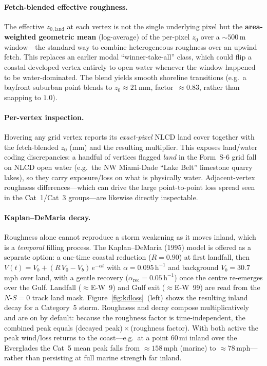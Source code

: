 \documentclass[11pt]{article}
\begin{document}
\paragraph{Fetch-blended effective roughness.}
The effective $z_{0,\text{land}}$ at each vertex is not the single underlying
pixel but the \textbf{area-weighted geometric mean} (log-average) of the
per-pixel $z_0$ over a $\sim500$\,m window---the standard way to combine
heterogeneous roughness over an upwind fetch. This replaces an earlier
modal ``winner-take-all'' class, which could flip a coastal developed vertex
entirely to open water whenever the window happened to be water-dominated. The
blend yields smooth shoreline transitions (e.g.\ a bayfront suburban point
blends to $z_0\!\approx\!21$\,mm, factor~$\approx\!0.83$, rather than snapping to
$1.0$).

\paragraph{Per-vertex inspection.}
Hovering any grid vertex reports its \emph{exact-pixel} NLCD land cover together
with the fetch-blended $z_0$ (mm) and the resulting multiplier. This exposes
land/water coding discrepancies: a handful of vertices flagged \emph{land} in the
Form~S-6 grid fall on NLCD open water (e.g.\ the NW Miami-Dade ``Lake Belt''
limestone quarry lakes), so they carry exposure/loss on what is physically water.
Adjacent-vertex roughness differences---which can drive the large point-to-point
loss spread seen in the Cat~1/Cat~3 groups---are likewise directly inspectable.

\paragraph{Kaplan--DeMaria decay.}
Roughness alone cannot reproduce a storm weakening as it moves inland, which is
a \emph{temporal} filling process. The Kaplan--DeMaria (1995) model is offered as
a separate option: a one-time coastal reduction ($R=0.90$) at first landfall, then
$V(t)=V_b+(R\,V_0-V_b)\,e^{-\alpha t}$ with $\alpha=0.095\,\text{h}^{-1}$ and
background $V_b=30.7$\,mph over land, with a gentle recovery
($\alpha_{\text{rec}}=0.05\,\text{h}^{-1}$) once the centre re-emerges over the
Gulf. Landfall ($\approx$E-W~9) and Gulf exit ($\approx$E-W~99) are read from the
$N$-$S=0$ track land mask. Figure~\ref{fig:kdloss}~(left) shows the resulting
inland decay for a Category~5 storm. Roughness and decay compose multiplicatively
and are on by default: because the roughness factor is time-independent, the
combined peak equals (decayed peak)\,$\times$\,(roughness factor). With both
active the peak wind/loss returns to the coast---e.g.\ at a point $60$\,mi inland
over the Everglades the Cat~5 mean peak falls from $\approx\!158$\,mph (marine) to
$\approx\!78$\,mph---rather than persisting at full marine strength far inland.
\end{document}
